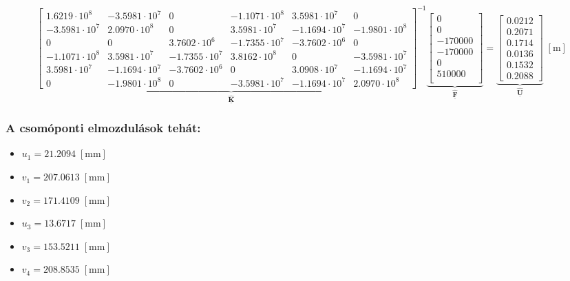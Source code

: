 \documentclass[12pt,a4paper]{article}
\def\vec#1{\underline{\mathbf{#1}}}
\def\m{\; \left[\mathrm{m}\right]}
\def\mili{\; \left[\mathrm{mm}\right]}
\begin{document}
{\tiny
\begin{equation}
    \underbrace{
    \begin{bmatrix}
        1.6219 \cdot 10^{8}  & -3.5981 \cdot 10^{7} & 0                    & -1.1071 \cdot 10^{8} & 3.5981 \cdot 10^{7}  & 0                    \\
        -3.5981 \cdot 10^{7} & 2.0970 \cdot 10^{8}  & 0                    & 3.5981 \cdot 10^{7}  & -1.1694 \cdot 10^{7} & -1.9801 \cdot 10^{8} \\
        0                    & 0                    & 3.7602 \cdot 10^{6}  & -1.7355 \cdot 10^{7} & -3.7602 \cdot 10^{6} & 0                    \\
        -1.1071 \cdot 10^{8} & 3.5981 \cdot 10^{7}  & -1.7355\cdot 10^{7}  & 3.8162 \cdot 10^{8}  & 0                    & -3.5981 \cdot 10^{7} \\
        3.5981 \cdot 10^{7}  & -1.1694 \cdot 10^{7} & -3.7602 \cdot 10^{6} & 0                    & 3.0908 \cdot 10^{7}  & -1.1694 \cdot 10^{7} \\
        0                    & -1.9801 \cdot 10^{8} & 0                    & -3.5981 \cdot 10^{7} & -1.1694 \cdot 10^{7} & 2.0970 \cdot 10^{8}
    \end{bmatrix}^{-1}}_{\vec{\hat{K}}}
    \underbrace{\begin{bmatrix}
            0       \\
            0       \\
            -170000 \\
            -170000 \\
            0       \\
            510000  \\
        \end{bmatrix}}_{\vec{\hat{F}}}=
    \underbrace{\begin{bmatrix}
            0.0212 \\
            0.2071 \\
            0.1714 \\
            0.0136 \\
            0.1532 \\
            0.2088
        \end{bmatrix}}_{\vec{\hat{U}}} \m
\end{equation}}
\subsubsection*{A csomóponti elmozdulások tehát:}
\begin{multicols}{2}
    \begin{itemize}
        \item $u_1=21.2094 \mili$
        \item $v_1=207.0613 \mili$
        \item $v_2=171.4109 \mili$
    \end{itemize}
    \columnbreak
    \begin{itemize}
        \item $u_3=13.6717 \mili$
        \item $v_3=153.5211 \mili$
        \item $v_4=208.8535 \mili$
    \end{itemize}
\end{multicols}
\end{document}
